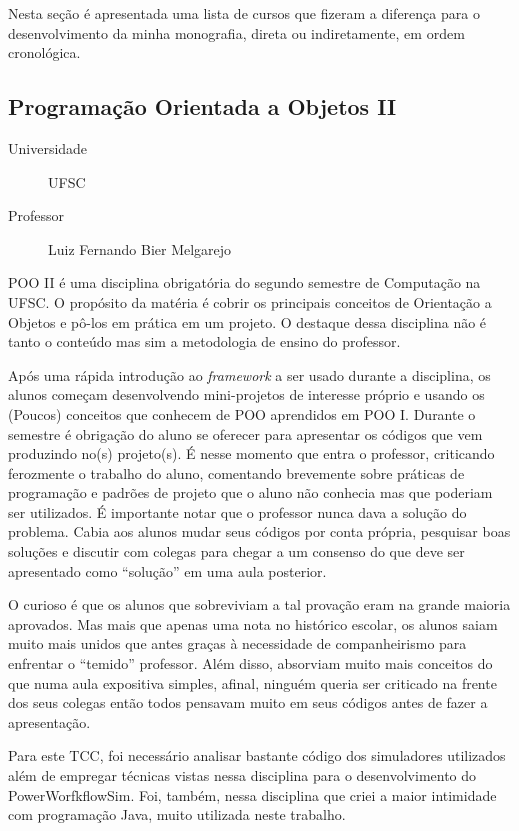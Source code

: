 Nesta seção é apresentada uma lista de cursos que fizeram a diferença para o
desenvolvimento da minha monografia, direta ou indiretamente, em ordem
cronológica.

\subsection{Programação Orientada a Objetos II}
\begin{description}
	\item[Universidade] UFSC
	\item[Professor] Luiz Fernando Bier Melgarejo
\end{description}
POO II é uma disciplina obrigatória do segundo semestre de Computação na UFSC.
O propósito da matéria é cobrir os principais conceitos de Orientação a Objetos
e pô-los em prática em um projeto. O destaque dessa disciplina não é tanto o
conteúdo mas sim a metodologia de ensino do professor.

Após uma rápida introdução ao \emph{framework} a ser usado durante a disciplina, os
alunos começam desenvolvendo mini-projetos de interesse próprio e usando os
(Poucos) conceitos que conhecem de POO aprendidos em POO I. Durante o semestre é
obrigação do aluno se oferecer para apresentar os códigos que vem produzindo 
no(s) projeto(s). É nesse momento que entra o professor, criticando ferozmente o
trabalho do aluno, comentando brevemente sobre práticas de programação e padrões
de projeto que o aluno não conhecia mas que poderiam ser utilizados. É
importante notar que o professor nunca dava a solução do problema. Cabia aos
alunos mudar seus códigos por conta própria, pesquisar boas soluções e 
discutir com colegas para chegar a um consenso do que deve ser apresentado como
``solução'' em uma aula posterior.

O curioso é que os alunos que sobreviviam a tal provação eram na grande maioria
aprovados. Mas mais que apenas uma nota no histórico escolar, os alunos saiam
muito mais unidos que antes graças à necessidade de companheirismo para
enfrentar o ``temido'' professor. Além disso, absorviam muito mais conceitos
do que numa aula expositiva simples, afinal, ninguém queria ser criticado na 
frente dos seus colegas então todos pensavam muito em seus códigos antes de 
fazer a apresentação.

Para este TCC, foi necessário analisar bastante código dos simuladores
utilizados além de empregar técnicas vistas nessa disciplina para o
desenvolvimento do PowerWorfkflowSim. Foi, também, nessa disciplina que criei
a maior intimidade com programação Java, muito utilizada neste trabalho.

